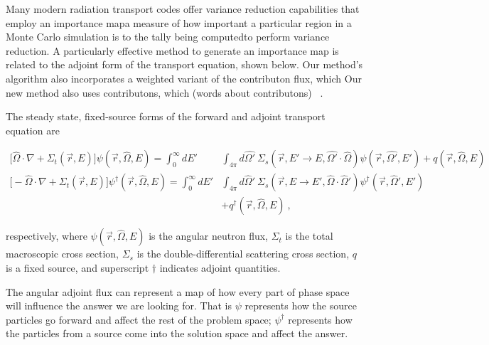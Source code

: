 \documentclass[12pt]{article}
\newcommand{\Macro}{\ensuremath{\Sigma}}
\newcommand{\vOmega}{\ensuremath{\hat{\Omega}}}
\newcommand{\rvec}{\ensuremath{\vec{r}}}
\begin{document}
Many modern radiation transport codes offer variance reduction capabilities that employ an importance map\textemdash a measure of how important a particular region in a Monte Carlo simulation is to the tally being computed\textemdash to perform variance reduction. A particularly effective method to generate an importance map is related to the adjoint form of the transport equation, shown below. 
Our method's algorithm also incorporates a weighted variant of the contributon flux, which 
Our new method also uses contributons, which (words about contributons) ~\cite{williams_contributorn_1992}. 

The steady state, fixed-source forms of the forward and adjoint transport equation are

\begin{align*}
\bigl[\hat{\Omega} \cdot \nabla + \Macro_t(\vec{r}, E)\bigr] \psi(\vec{r}, \hat{\Omega}, E)  =  \int_0^{\infty} dE' &\int_{4\pi} d\hat{\Omega'} \:\Macro_{s}(\vec{r}, E' \to E, \hat{\Omega'} \cdot \hat{\Omega}) \psi(\vec{r}, \hat{\Omega'}, E') + q(\vec{r}, \vOmega, E) \\
%
\bigl[-\vOmega \cdot \nabla + \Sigma_t(\rvec, E)\bigr] \psi^{\dagger}(\vec{r}, \vOmega, E) = \int_0^{\infty} dE' &\int_{4\pi} d\vOmega' \: \Sigma_s(\rvec, E \rightarrow E', \vOmega \cdot \vOmega') \psi^{\dagger}(\rvec, \vOmega', E') \\
&+ q^{\dagger}(\vec{r}, \vOmega, E) \:, 
\end{align*}

respectively, where $\psi(\vec{r}, \hat{\Omega}, E)$ is the angular neutron flux, $\Sigma_t$ is the total macroscopic cross section, $\Sigma_s$ is the double-differential scattering cross section, $q$ is a fixed source, and superscript $\dagger$ indicates adjoint quantities. 

The angular adjoint flux can represent a map of how every part of phase space will influence the answer we are looking for.
That is $\psi$ represents how the source particles go forward and affect the rest of the problem space; $\psi^{\dagger}$ represents how the particles from a source come into the solution space and affect the answer. 
\end{document}
